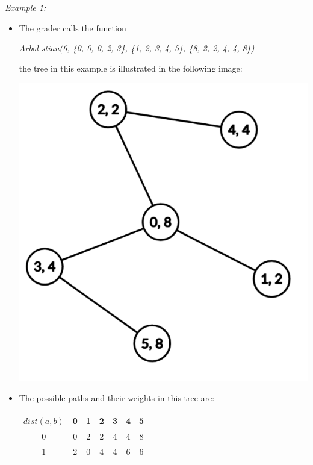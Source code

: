 \documentclass[12pt]{scrartcl}
\begin{document}
        {\itshape Example 1:}
        \begin{itemize}
            \item The grader calls the function 
            \begin{center}
                \textit{Arbol-stian(6, \{0, 0, 0, 2, 3\}, \{1, 2, 3, 4, 5\}, \{8, 2, 2, 4, 4, 8\})}
            \end{center}
            the tree in this example is illustrated in the following image:
            
            \begin{center}
                \includegraphics[scale=0.25]{ej1.png}
            \end{center}
            \item The possible paths and their weights in this tree are:
            \begin{center}
                \begin{tabular}{|c||c|c|c|c|c|c|}
                    \hline
                     $dist(a, b)$ & 0 & 1 & 2 & 3 & 4 & 5 \\
                     \hline
                     \hline
                     0 & 0 & 2 & 2 & 4 & 4 & 8 \\
                     \hline
                     1 & 2 & 0 & 4 & 4 & 6 & 6 \\

\end{tabular}
\end{center}
\end{itemize}
\end{document}
